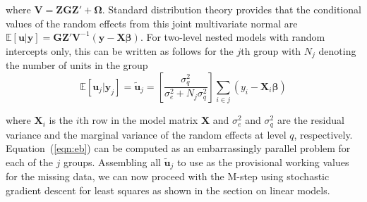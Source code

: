 \documentclass[12pt]{article}
\begin{document}
\noindent where $\bm{V} = \bm{ZGZ'} + \bm{\Omega}$. Standard distribution theory provides that the conditional values of the random effects from this joint multivariate normal are $\mathbb{E}[\bm{u}|\bm{y}]  = \bm{GZ'V}^{-1}(\bm{y}-\bm{X\beta})$. For two-level nested models with random intercepts only, this can be written as follows for the $j$th group with $N_j$ denoting the number of units in the group
\begin{equation}
\label{eqn:eb}
\mathbb{E}[\bm{u}_j|\bm{y}_j] = \bm{\widetilde{u}}_j = \left[\frac{\sigma_{q}^2}{\sigma_{e}^2 + N_{j}\sigma_{q}^2}\right] \sum_{i \in j} \left(y_{i} - \bm{X}_i\bm{\beta}\right)
\end{equation}

\noindent where $\bm{X}_i$ is the $i$th row in the model matrix $\bm{X}$ and $\sigma_{e}^2$ and $\sigma_{q}^2$ are the residual variance and the marginal variance of the random effects at level $q$, respectively. Equation~(\ref{eqn:eb}) can be computed as an embarrassingly parallel problem for each of the $j$ groups. Assembling all $\bm{\widetilde{u}}_j$ to use as the provisional working values for the missing data, we can now proceed with the M-step using stochastic gradient descent for least squares as shown in the section on linear models. 


\clearpage 
 
\end{document}
